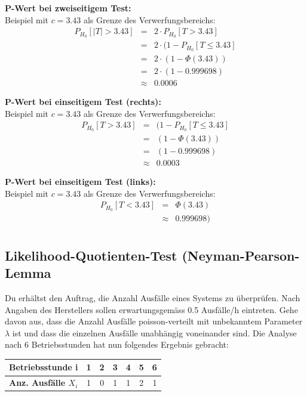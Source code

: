 \documentclass[10pt,a4paper,twocolumn]{article}
\begin{document}
\textbf{P-Wert bei zweiseitigem Test:} \\
Beispiel mit $c=3.43$ als Grenze des Verwerfungsbereichs:
\[
\begin{array}{rcl}
	P_{H_0}[|T|>3.43] & = & 2\cdot P_{H_0}[T>3.43] \\
	& = & 2\cdot (1-P_{H_0}[T\leq 3.43] \\
	& = & 2\cdot (1-\Phi(3.43)) \\
	& = & 2\cdot (1-0.999698) \\	
	& \approx & 0.0006
\end{array}
\]

\vspace{10pt}

\textbf{P-Wert bei einseitigem Test (rechts):} \\
Beispiel mit $c=3.43$ als Grenze des Verwerfungsbereichs:
\[
\begin{array}{rcl}
	P_{H_0}[T>3.43] & = & (1-P_{H_0}[T\leq 3.43] \\
	& = & (1-\Phi(3.43)) \\
	& = & (1-0.999698) \\	
	& \approx & 0.0003
\end{array}
\]

\vspace{10pt}

\textbf{P-Wert bei einseitigem Test (links):} \\
Beispiel mit $c=3.43$ als Grenze des Verwerfungsbereichs:
\[
\begin{array}{rcl}
	P_{H_0}[T<3.43] & = & \Phi(3.43) \\
	& \approx & 0.999698) \\
\end{array}
\]

\subsection{Likelihood-Quotienten-Test (Neyman-Pearson-Lemma}
Du erhältst den Auftrag, die Anzahl Ausfälle eines Systems zu überprüfen. Nach Angaben des Herstellers sollen erwartungsgemäss 0.5 Ausfälle/h eintreten. Gehe davon aus, dass die Anzahl Ausfälle poisson-verteilt mit unbekanntem Parameter $\lambda$ ist und dass die einzelnen Ausfälle unabhängig voneinander sind. Die Analyse nach 6 Betriebsstunden hat nun folgendes Ergebnis gebracht:

\begin{center}
  \begin{tabular}{|l|c|c|c|c|c|c|}
    \hline
    \textbf{Betriebsstunde i} & 1 & 2 & 3 & 4 & 5 & 6 \\ \hline
    \textbf{Anz. Ausfälle $X_i$} & 1 & 0 & 1 & 1 & 2 & 1 \\
    \hline
  \end{tabular}
\end{center}
\end{document}
